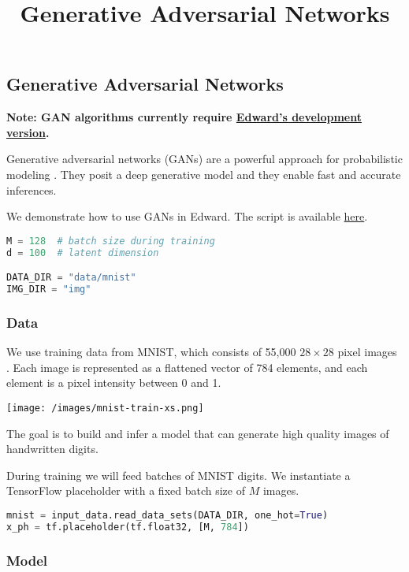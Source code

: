 \title{Generative Adversarial Networks}

\subsection{Generative Adversarial Networks}

\textbf{Note: GAN algorithms currently require
\href{/getting-started}{Edward's development version}.}

Generative adversarial networks (GANs) are a powerful approach for
probabilistic modeling \citep{goodfellow2014generative,goodfellow2016nips}.
They posit a deep generative model and they enable fast and accurate
inferences.

We demonstrate how to use GANs in Edward.
The script is available
\href{https://github.com/blei-lab/edward/blob/master/examples/gan.py}
{here}.

\begin{lstlisting}[language=Python]
M = 128  # batch size during training
d = 100  # latent dimension

DATA_DIR = "data/mnist"
IMG_DIR = "img"
\end{lstlisting}


\subsubsection{Data}

We use training data from MNIST, which consists of 55,000 $28\times
28$ pixel images \citep{lecun1998gradient}. Each image is represented
as a flattened vector of 784 elements, and each element is a pixel
intensity between 0 and 1.

\texttt{[image: /images/mnist-train-xs.png]}

The goal is to build and infer a model that can generate high quality
images of handwritten digits.

During training we will feed batches of MNIST digits. We instantiate a
TensorFlow placeholder with a fixed batch size of $M$ images.

\begin{lstlisting}[language=Python]
mnist = input_data.read_data_sets(DATA_DIR, one_hot=True)
x_ph = tf.placeholder(tf.float32, [M, 784])
\end{lstlisting}


\subsubsection{Model}

